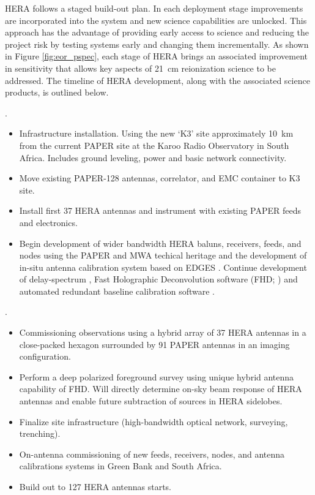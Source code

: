 \documentclass[preprint]{aastex}
\begin{document}
HERA follows a staged build-out plan.  In
each deployment stage improvements are incorporated into the system and new
science capabilities are unlocked.  This approach has the advantage of
providing early access to science and reducing the project risk by testing systems
early and changing them incrementally.  As shown in Figure \ref{fig:eor_pspec}, each
stage of HERA brings an associated improvement in sensitivity that allows key
aspects of 21~cm reionization science to be addressed.  The timeline of HERA
development, along with the associated science products, is outlined below. 


.  
\begin{itemize}\setlength{\parskip}{0pt}
\vspace{-7pt}
  \item Infrastructure installation. Using the new `K3' site approximately 10~km from the current PAPER site at the Karoo Radio Observatory in South Africa. Includes ground leveling, power and basic network connectivity.
  \item Move existing PAPER-128 antennas, correlator, and EMC container to K3 site.
  \item Install first 37 HERA antennas and instrument with existing PAPER feeds and electronics. 
  \item Begin development of wider bandwidth HERA baluns, receivers, feeds, and nodes using the PAPER and MWA techical heritage \citep{} and the development of in-situ antenna calibration system based on EDGES \citep{}. Continue development of delay-spectrum \citep{}, Fast Holographic Deconvolution software (FHD; \citealt{}) and automated redundant baseline calibration software \citep{Liu2010}.
\end{itemize}


.  
\begin{itemize}\setlength{\parskip}{0pt}
\vspace{-7pt}
  \item Commissioning observations using a hybrid array of 37 HERA antennas in a close-packed hexagon surrounded by 91 PAPER antennas in an imaging configuration.
  \item Perform a deep polarized foreground survey using unique hybrid antenna capability of FHD. Will directly determine on-sky beam response of HERA antennas and enable future subtraction of sources in HERA sidelobes.
  \item Finalize site infrastructure (high-bandwidth optical network, surveying, trenching).
  \item On-antenna commissioning of new feeds, receivers, nodes, and antenna calibrations systems in Green Bank and South Africa.
  \item Build out to 127 HERA antennas starts.
\end{itemize}
\end{document}

